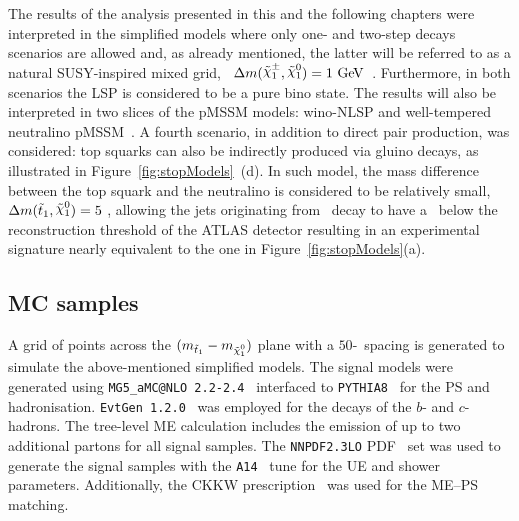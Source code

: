 
			The results of the analysis presented in this and the following chapters were interpreted in the simplified models where only one- and two-step decays scenarios are allowed and, as already mentioned, the latter will be referred to as a natural \ac{SUSY}-inspired mixed grid, \ie\ $\Delta m(\chinoonepm, \ninoone) = 1 \GeV$~\cite{Alwall:2008ve,Alwall:2008ag,Alves:2011wf}. Furthermore, in both scenarios the \ac{LSP} is considered to be a pure bino state. The results will also be interpreted in two slices of the \ac{pMSSM} models: wino-\ac{NLSP} and well-tempered neutralino \ac{pMSSM}~\cite{Djouadi:1998di,Berger:2008cq}.
			A fourth scenario, in addition to direct pair production, was considered: top squarks can also be indirectly produced via gluino decays, as illustrated in Figure~\ref{fig:stopModels}~(d). In such model, the mass difference between the top squark and the neutralino is considered to be relatively small, $\Delta m(\stopone, \ninoone) = 5$ \GeV, allowing the jets originating from \stopone\ decay to have a \pt\ below the reconstruction threshold of the \ac{ATLAS} detector resulting in an experimental signature nearly equivalent to the one in Figure~\ref{fig:stopModels}(a).


		\subsection{MC samples}

			A grid of points across the $(\mstopone-\mninoone)$ plane with a $50$-\GeV\ spacing is generated to simulate the above-mentioned simplified models. %
			The signal models were generated using \texttt{MG5\_aMC@NLO 2.2-2.4}~\cite{madgraph} interfaced to \texttt{PYTHIA8}~\cite{pythia8} for the \ac{PS} and hadronisation. \texttt{EvtGen 1.2.0}~\cite{evtGen} was employed for the decays of the  $b$- and $c$-hadrons. The tree-level \ac{ME} calculation includes the emission of up to two additional partons for all signal samples. The \texttt{NNPDF2.3LO} \ac{PDF}~\cite{PDFs} set was used to generate the signal samples with the \verb+A14+~\cite{CT10} tune for the \ac{UE} and shower parameters. Additionally, the \ac{CKKW} prescription~\cite{CKKW} was used for the \ac{ME}–\ac{PS} matching. 

